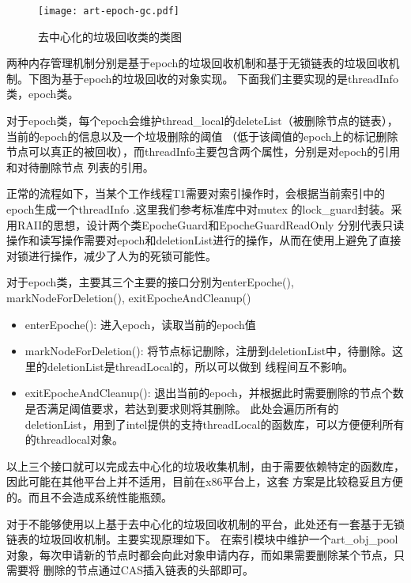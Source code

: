 \begin{figure}[h]
  \centering
  \texttt{[image: art-epoch-gc.pdf]}
  \caption{去中心化的垃圾回收类的类图}
  \label{fig:art-epoch-gc}
\end{figure}


两种内存管理机制分别是基于epoch的垃圾回收机制和基于无锁链表的垃圾回收机制。下图为基于epoch的垃圾回收的对象实现。
下面我们主要实现的是threadInfo类，epoch类。

对于epoch类，每个epoch会维护thread\_local的deleteList（被删除节点的链表），当前的epoch的信息以及一个垃圾删除的阈值
（低于该阈值的epoch上的标记删除节点可以真正的被回收），而threadInfo主要包含两个属性，分别是对epoch的引用和对待删除节点
列表的引用。

正常的流程如下，当某个工作线程T1需要对索引操作时，会根据当前索引中的epoch生成一个threadInfo .这里我们参考标准库中对mutex
的lock\_guard封装。采用RAII的思想，设计两个类EpocheGuard和EpocheGuardReadOnly
分别代表只读操作和读写操作需要对epoch和deletionList进行的操作，从而在使用上避免了直接对锁进行操作，减少了人为的死锁可能性。

对于epoch类，主要其三个主要的接口分别为enterEpoche(), markNodeForDeletion(), exitEpocheAndCleanup()

\begin{itemize}

\item enterEpoche(): 进入epoch，读取当前的epoch值

\item markNodeForDeletion(): 将节点标记删除，注册到deletionList中，待删除。这里的deletionList是threadLocal的，所以可以做到
线程间互不影响。

\item exitEpocheAndCleanup(): 退出当前的epoch，并根据此时需要删除的节点个数是否满足阈值要求，若达到要求则将其删除。
此处会遍历所有的deletionList，用到了intel提供的支持threadLocal的函数库，可以方便便利所有的threadlocal对象。

\end{itemize}

以上三个接口就可以完成去中心化的垃圾收集机制，由于需要依赖特定的函数库，因此可能在其他平台上并不适用，目前在x86平台上，这套
方案是比较稳妥且方便的。而且不会造成系统性能瓶颈。

对于不能够使用以上基于去中心化的垃圾回收机制的平台，此处还有一套基于无锁链表的垃圾回收机制。主要实现原理如下。
在索引模块中维护一个art\_obj\_pool对象，每次申请新的节点时都会向此对象申请内存，而如果需要删除某个节点，只需要将
删除的节点通过CAS插入链表的头部即可。

